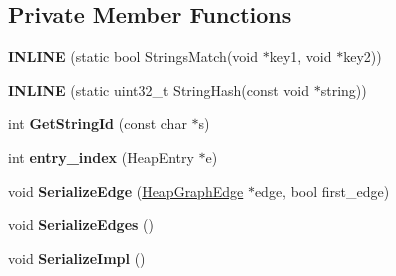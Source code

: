 \subsection*{Private Member Functions}
\begin{DoxyCompactItemize}
\item 
{\bfseries I\+N\+L\+I\+NE} (static bool Strings\+Match(void $\ast$key1, void $\ast$key2))\hypertarget{classv8_1_1internal_1_1_heap_snapshot_j_s_o_n_serializer_a500ce0919ea74f2b8d31ab994eeadc12}{}\label{classv8_1_1internal_1_1_heap_snapshot_j_s_o_n_serializer_a500ce0919ea74f2b8d31ab994eeadc12}

\item 
{\bfseries I\+N\+L\+I\+NE} (static uint32\+\_\+t String\+Hash(const void $\ast$string))\hypertarget{classv8_1_1internal_1_1_heap_snapshot_j_s_o_n_serializer_a588e11e9611192f6ef227a76de21fdb7}{}\label{classv8_1_1internal_1_1_heap_snapshot_j_s_o_n_serializer_a588e11e9611192f6ef227a76de21fdb7}

\item 
int {\bfseries Get\+String\+Id} (const char $\ast$s)\hypertarget{classv8_1_1internal_1_1_heap_snapshot_j_s_o_n_serializer_ad48e37a6d85662beccad7c357d4bd9e4}{}\label{classv8_1_1internal_1_1_heap_snapshot_j_s_o_n_serializer_ad48e37a6d85662beccad7c357d4bd9e4}

\item 
int {\bfseries entry\+\_\+index} (Heap\+Entry $\ast$e)\hypertarget{classv8_1_1internal_1_1_heap_snapshot_j_s_o_n_serializer_a71405039affb3195f687a4e23d9d0909}{}\label{classv8_1_1internal_1_1_heap_snapshot_j_s_o_n_serializer_a71405039affb3195f687a4e23d9d0909}

\item 
void {\bfseries Serialize\+Edge} (\hyperlink{classv8_1_1_heap_graph_edge}{Heap\+Graph\+Edge} $\ast$edge, bool first\+\_\+edge)\hypertarget{classv8_1_1internal_1_1_heap_snapshot_j_s_o_n_serializer_a572501ca0143b00231c85a444d712a28}{}\label{classv8_1_1internal_1_1_heap_snapshot_j_s_o_n_serializer_a572501ca0143b00231c85a444d712a28}

\item 
void {\bfseries Serialize\+Edges} ()\hypertarget{classv8_1_1internal_1_1_heap_snapshot_j_s_o_n_serializer_a366135f1d9b4c29bd0a66822cf7e4b7b}{}\label{classv8_1_1internal_1_1_heap_snapshot_j_s_o_n_serializer_a366135f1d9b4c29bd0a66822cf7e4b7b}

\item 
void {\bfseries Serialize\+Impl} ()\hypertarget{classv8_1_1internal_1_1_heap_snapshot_j_s_o_n_serializer_a6e118cc108559a4aa206bb80c9fa1812}{}\label{classv8_1_1internal_1_1_heap_snapshot_j_s_o_n_serializer_a6e118cc108559a4aa206bb80c9fa1812}


\end{DoxyCompactItemize}
